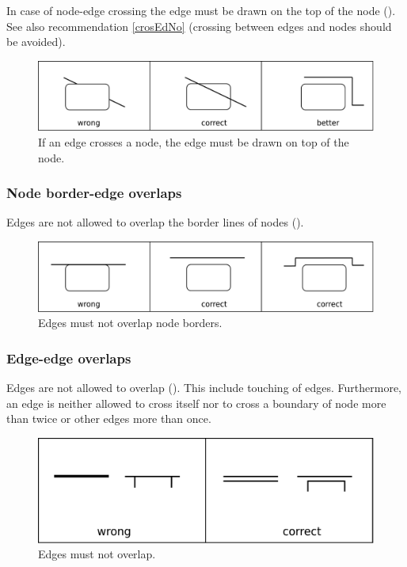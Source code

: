 In case of node-edge crossing the edge must be drawn on the top of
the node (). See also recommendation \ref{crosEdNo} (crossing between
edges and nodes should be avoided).

\begin{figure}[h!]
  \centering
  \includegraphics[scale=0.3]{images/layout-node-edge}
  \caption{If an edge crosses a node, the edge must be drawn on top
  of the node.}\label{fig:layout2}
\end{figure}

\subsubsection{Node border-edge overlaps}

Edges are not allowed to overlap the border lines of nodes ().

\begin{figure}[h!]
  \centering
  \includegraphics[scale=0.3]{images/layout-node-border-edge}
  \caption{Edges must not overlap node borders.}\label{fig:layout3}
\end{figure}

\subsubsection{Edge-edge overlaps}

Edges are not allowed to overlap (). This include touching of edges.
Furthermore, an edge is neither allowed to cross itself nor to cross
a boundary of node more than twice or other edges more than once.

\begin{figure}[h!]
  \centering
  \includegraphics[scale=0.3]{images/layout-edge-edge}
  \caption{Edges must not overlap.}\label{fig:layout4}
\end{figure}

